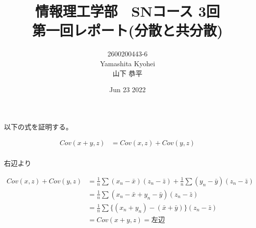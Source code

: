 \documentclass[dvipdfmx,autodetect-engine,titlepage]{jsarticle}
\title{情報理工学部　SNコース 3回\\
第一回レポート(分散と共分散)\\}
\author{2600200443-6\\Yamashita Kyohei\\山下 恭平}
\date{Jun 23 2022}
\begin{document}
\maketitle

\section{}

以下の式を証明する。

\begin{align*}
  Cov(x+y,z) &= Cov(x,z) + Cov(y,z)\\
\end{align*}

右辺より

\begin{align*}
Cov(x,z) + Cov(y,z) &= \frac{1}{n}\sum (x_{n}-\bar{x})(z_{n}-\bar{z}) + \frac{1}{n}\sum (y_{n}-\bar{y})(z_{n}-\bar{z})\\
&= \frac{1}{n}\sum (x_{n}-\bar{x}+y_{n}-\bar{y})(z_{n}-\bar{z})\\
&= \frac{1}{n}\sum \{ (x_{n}+y_{n})-(\bar{x}+\bar{y})\} (z_{n}-\bar{z})\\
&= Cov(x+y,z) = 左辺
\end{align*}
\end{document}
